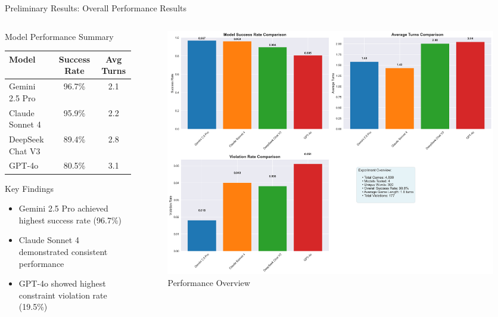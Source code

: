 \documentclass[aspectratio=169]{beamer}
\begin{document}
\begin{frame}{Preliminary Results: Overall Performance Results}
\begin{columns}[c]
\begin{column}{0.5\textwidth}
\begin{block}{Model Performance Summary}
\begin{center}
\begin{tabular}{lcc}
\toprule
\textbf{Model} & \textbf{Success Rate} & \textbf{Avg Turns} \\
\midrule
Gemini 2.5 Pro & 96.7\% & 2.1 \\
Claude Sonnet 4 & 95.9\% & 2.2 \\
DeepSeek Chat V3 & 89.4\% & 2.8 \\
GPT-4o & 80.5\% & 3.1 \\
\bottomrule
\end{tabular}
\end{center}
\end{block}

\begin{block}{Key Findings}
\begin{itemize}
    \item Gemini 2.5 Pro achieved highest success rate (96.7\%)
    \item Claude Sonnet 4 demonstrated consistent performance
    \item GPT-4o showed highest constraint violation rate (19.5\%)
\end{itemize}
\end{block}
\end{column}

\begin{column}{0.48\textwidth}
\begin{figure}
\includegraphics[width=\textwidth]{comprehensive_figures/figure1_overview.png}
\caption{Performance Overview}
\end{figure}
\end{column}
\end{columns}
\end{frame}
\end{document}

